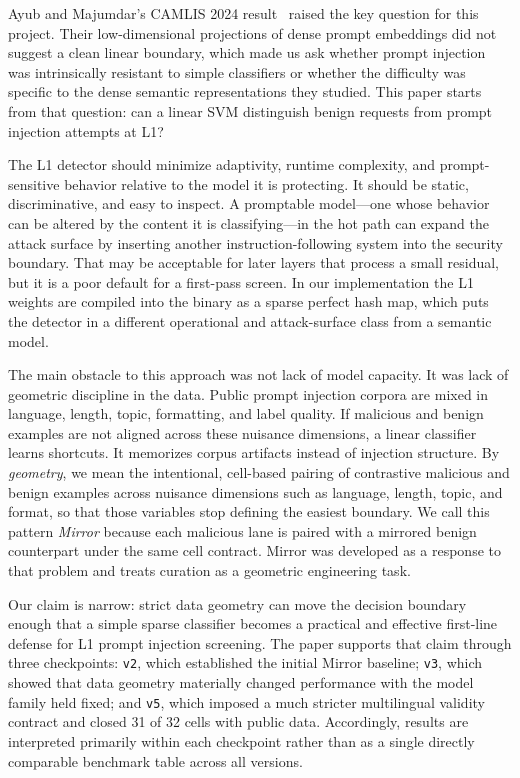 \documentclass[11pt,a4paper]{article}
\begin{document}
Ayub and Majumdar's CAMLIS 2024 result~\cite{ayub2024camlis} raised the
key question for this project. Their low-dimensional projections of
dense prompt embeddings did not suggest a clean linear boundary, which
made us ask whether prompt injection was intrinsically resistant to
simple classifiers or whether the difficulty was specific to the dense
semantic representations they studied. This paper starts from that
question: can a linear SVM distinguish benign requests from prompt
injection attempts at L1?

The L1 detector should minimize adaptivity, runtime complexity, and
prompt-sensitive behavior relative to the model it is protecting. It
should be static, discriminative, and easy to inspect. A promptable
model---one whose behavior can be altered by the content it is
classifying---in the hot path can expand the attack surface by inserting
another instruction-following system into the security boundary. That
may be acceptable for later layers that process a small residual, but it
is a poor default for a first-pass screen. In our implementation the L1
weights are compiled into the binary as a sparse perfect hash map, which
puts the detector in a different operational and attack-surface class
from a semantic model.

The main obstacle to this approach was not lack of model capacity. It
was lack of geometric discipline in the data. Public prompt injection
corpora are mixed in language, length, topic, formatting, and label
quality. If malicious and benign examples are not aligned across these
nuisance dimensions, a linear classifier learns shortcuts. It memorizes
corpus artifacts instead of injection structure. By \emph{geometry}, we
mean the intentional, cell-based pairing of contrastive malicious and
benign examples across nuisance dimensions such as language, length,
topic, and format, so that those variables stop defining the easiest
boundary. We call this pattern \emph{Mirror} because each malicious lane
is paired with a mirrored benign counterpart under the same cell
contract. Mirror was developed as a response to that problem and treats
curation as a geometric engineering task.

Our claim is narrow: strict data geometry can move the decision boundary
enough that a simple sparse classifier becomes a practical and effective
first-line defense for L1 prompt injection screening. The paper supports
that claim through three checkpoints: \texttt{v2}, which established the
initial Mirror baseline; \texttt{v3}, which showed that data geometry
materially changed performance with the model family held fixed; and
\texttt{v5}, which imposed a much stricter multilingual validity
contract and closed 31 of 32 cells with public data. Accordingly,
results are interpreted primarily within each checkpoint rather than as
a single directly comparable benchmark table across all versions.
\end{document}
